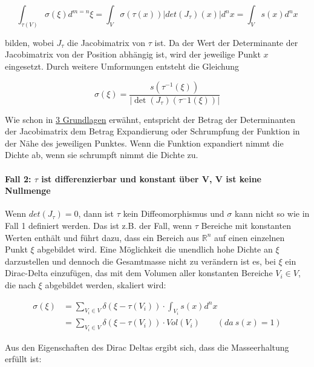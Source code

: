 \documentclass[a4paper,fontsize=12pt,toc=bib,halfparskip]{scrartcl}
\begin{document}
\begin{equation}
	\int_{\tau(V)}\sigma(\xi)d^{m=n}\xi = \int_{V}\sigma(\tau(x))|det(J_\tau)(x)|d^nx = \int_{V}s(x)d^nx
\end{equation}

bilden, wobei $J_\tau$ die Jacobimatrix von $\tau$ ist. Da der Wert der Determinante der Jacobimatrix von der Position abh\"angig ist, wird der jeweilige Punkt $x$ eingesetzt. Durch weitere Umformungen entsteht die Gleichung

\begin{equation}
	\sigma(\xi) = \frac{s(\tau^{-1}(\xi))}{|\det(J_\tau)(\tau^-1(\xi))|}
	\label{Case1Formula}
\end{equation}

Wie schon in \hyperref[sec:Grundlagen]{3 Grundlagen} erw\"ahnt, entspricht der Betrag der Determinanten der Jacobimatrix dem Betrag Expandierung oder Schrumpfung der Funktion in der N\"ahe des jeweiligen Punktes. Wenn die Funktion expandiert nimmt die Dichte ab, wenn sie schrumpft nimmt die Dichte zu.

\paragraph{Fall 2: $\tau$ ist differenzierbar und konstant \"uber V, V ist keine Nullmenge}
Wenn $det(J_\tau) = 0$, dann ist $\tau$ kein Diffeomorphismus und $\sigma$ kann nicht so wie in Fall 1 definiert werden. Das ist z.B. der Fall, wenn $\tau$ Bereiche mit konstanten Werten enth\"alt und f\"uhrt dazu, dass ein Bereich aus $\mathbb{R}^n$ auf einen einzelnen Punkt $\xi$ abgebildet wird. Eine M\"oglichkeit die unendlich hohe Dichte an $\xi$ darzustellen und dennoch die Gesamtmasse nicht zu ver\"andern ist es, bei $\xi$ ein Dirac-Delta einzuf\"ugen, das mit dem Volumen aller konstanten Bereiche $V_i \in V$, die nach $\xi$ abgebildet werden, skaliert wird:

\begin{equation}
	\begin{split}
	\sigma(\xi) &= \sum_{V_i \in V}\delta(\xi - \tau(V_i)) \cdot \int_{V_i}s(x)d^nx\\
				&= \sum_{V_i \in V}\delta(\xi - \tau(V_i)) \cdot Vol(V_i)~~~~~~~~~(da~s(x) = 1)
	\end{split}
	\label{DiracTimesVolume}
\end{equation}

Aus den Eigenschaften des Dirac Deltas ergibt sich, dass die Masseerhaltung erf\"ullt ist:
\end{document}
